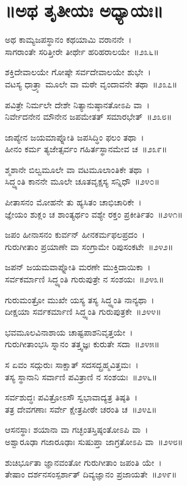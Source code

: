 \section{॥ಅಥ ತೃತೀಯಃ ಅಧ್ಯಾಯಃ॥}

ಅಥ ಕಾಮ್ಯಜಪಸ್ಥಾನಂ ಕಥಯಾಮಿ ವರಾನನೇ~।\\
ಸಾಗರಾಂತೇ ಸರಿತ್ತೀರೇ ತೀರ್ಥೇ ಹರಿಹರಾಲಯೇ~॥೨೩೬॥

ಶಕ್ತಿದೇವಾಲಯೇ ಗೋಷ್ಠೇ ಸರ್ವದೇವಾಲಯೇ ಶುಭೇ~।\\
ವಟಸ್ಯ ಧಾತ್ರ್ಯಾ ಮೂಲೇ ವಾ ಮಠೇ ವೃಂದಾವನೇ ತಥಾ~॥೨೩೭॥

ಪವಿತ್ರೇ ನಿರ್ಮಲೇ ದೇಶೇ ನಿತ್ಯಾನುಷ್ಠಾನತೋಽಪಿ ವಾ~।\\
ನಿರ್ವೇದನೇನ ಮೌನೇನ ಜಪಮೇತತ್ ಸಮಾರಭೇತ್~॥೨೩೮॥

ಜಾಪ್ಯೇನ ಜಯಮಾಪ್ನೋತಿ ಜಪಸಿದ್ಧಿಂ ಫಲಂ ತಥಾ~।\\
ಹೀನಂ ಕರ್ಮ ತ್ಯಜೇತ್ಸರ್ವಂ ಗಹಿರ್ತಸ್ಥಾನಮೇವ ಚ~॥೨೩೯॥

ಶ್ಮಶಾನೇ ಬಿಲ್ವಮೂಲೇ ವಾ ವಟಮೂಲಾಂತಿಕೇ ತಥಾ~।\\
ಸಿದ್ಧ್ಯಂತಿ ಕಾನನೇ ಮೂಲೇ ಚೂತವೃಕ್ಷಸ್ಯ ಸನ್ನಿಧೌ~॥೨೪೦॥

ಪೀತಾಸನಂ ಮೋಹನೇ ತು ಹ್ಯಸಿತಂ ಚಾಭಿಚಾರಿಕೇ~।\\
ಜ್ಞೇಯಂ ಶುಕ್ಲಂ ಚ ಶಾಂತ್ಯರ್ಥಂ ವಶ್ಯೇ ರಕ್ತಂ ಪ್ರಕೀರ್ತಿತಂ~॥೨೪೧॥

ಜಪಂ ಹೀನಾಸನಂ ಕುರ್ವನ್ ಹೀನಕರ್ಮಫಲಪ್ರದಂ~।\\
ಗುರುಗೀತಾಂ ಪ್ರಯಾಣೇ ವಾ ಸಂಗ್ರಾಮೇ ರಿಪುಸಂಕಟೇ~॥೨೪೨॥

ಜಪನ್ ಜಯಮವಾಪ್ನೋತಿ ಮರಣೇ ಮುಕ್ತಿದಾಯಿಕಾ~।\\
ಸರ್ವಕರ್ಮಾಣಿ ಸಿದ್ಧ್ಯಂತಿ ಗುರುಪುತ್ರೇ ನ ಸಂಶಯಃ~॥೨೪೩॥

ಗುರುಮಂತ್ರೋ ಮುಖೇ ಯಸ್ಯ ತಸ್ಯ ಸಿದ್ಧ್ಯಂತಿ ನಾನ್ಯಥಾ~।\\
ದೀಕ್ಷಯಾ ಸರ್ವಕರ್ಮಾಣಿ ಸಿದ್ಧ್ಯಂತಿ ಗುರುಪುತ್ರಕೇ~॥೨೪೪॥

ಭವಮೂಲವಿನಾಶಾಯ ಚಾಷ್ಟಪಾಶನಿವೃತ್ತಯೇ~।\\
ಗುರುಗೀತಾಂಭಸಿ ಸ್ನಾನಂ ತತ್ತ್ವಜ್ಞಃ ಕುರುತೇ ಸದಾ~॥೨೪೫॥

ಸ ಏವಂ ಸದ್ಗುರುಃ ಸಾಕ್ಷಾತ್ ಸದಸದ್ಬ್ರಹ್ಮವಿತ್ತಮಃ~।\\
ತಸ್ಯ ಸ್ಥಾನಾನಿ ಸರ್ವಾಣಿ ಪವಿತ್ರಾಣಿ ನ ಸಂಶಯಃ~॥೨೪೬॥

ಸರ್ವಶುದ್ಧಃ ಪವಿತ್ರೋಽಸೌ ಸ್ವಭಾವಾದ್ಯತ್ರ ತಿಷ್ಠತಿ~।\\
ತತ್ರ ದೇವಗಣಾಃ ಸರ್ವೇ ಕ್ಷೇತ್ರಪೀಠೇ ಚರಂತಿ ಚ~॥೨೪೭॥

ಆಸನಸ್ಥಾಃ ಶಯಾನಾ ವಾ ಗಚ್ಛಂತಸ್ತಿಷ್ಠಂತೋಽಪಿ ವಾ~।\\
ಅಶ್ವಾರೂಢಾ ಗಜಾರೂಢಾಃ ಸುಷುಪ್ತಾ ಜಾಗ್ರತೋಽಪಿ ವಾ~॥೨೪೮॥

ಶುಚಿರ್ಭೂತಾ ಜ್ಞಾನವಂತೋ ಗುರುಗೀತಾಂ ಜಪಂತಿ ಯೇ~।\\
ತೇಷಾಂ ದರ್ಶನಸಂಸ್ಪರ್ಶಾತ್ ದಿವ್ಯಜ್ಞಾನಂ ಪ್ರಜಾಯತೇ~॥೨೪೯॥

